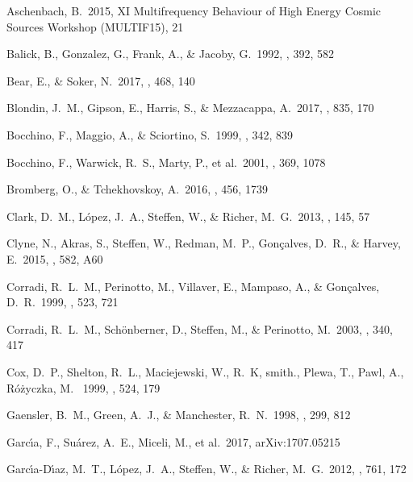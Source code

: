 \documentclass[12pt,preprint,a4paper]{aastex}
\begin{document}
 
\begin{thebibliography}

  Aschenbach, B.\ 2015, XI Multifrequency Behaviour of High Energy Cosmic Sources Workshop (MULTIF15), 21 

 Balick, B., Gonzalez, G., Frank, A., \& Jacoby, G.\ 1992, \apj, 392, 582 

 Bear, E., \& Soker, N.\ 2017, \mnras, 468, 140

 Blondin, J.~M., Gipson, E., Harris, S., \& Mezzacappa, A.\ 2017, \apj, 835, 170

 Bocchino, F., Maggio, A., \& Sciortino, S.\ 1999, \aap, 342, 839

 Bocchino, F., Warwick, R.~S., Marty, P., et al.\ 2001, \aap, 369, 1078

 Bromberg, O., \& Tchekhovskoy, A.\ 2016, \mnras, 456, 1739

 Clark, D.~M., L{\'o}pez, J.~A., Steffen, W., \& Richer, M.~G.\ 2013, \aj, 145, 57

 Clyne, N., Akras, S., Steffen, W., Redman, M.~P., Gonçalves, D.~R., \& Harvey, E.\ 2015, \aap, 582, A60

 Corradi, R.~L.~M., Perinotto, M., Villaver, E., Mampaso, A., \& Gon{\c c}alves, D.~R.\ 1999, \apj, 523, 721 

 Corradi, R.~L.~M., Sch{\"o}nberner, D., Steffen, M., \& Perinotto, M.\ 2003, \mnras, 340, 417 

 Cox, D.~P., Shelton, R.~L., Maciejewski, W., R.~K, smith., Plewa, T., Pawl, A., R\'{o}\.{z}yczka, M. \ 1999, \apj, 524, 179


 Gaensler, B.~M., Green, A.~J., \& Manchester, R.~N.\ 1998, \mnras, 299, 812


 Garc{\'{\i}}a, F., Su{\'a}rez, A.~E., Miceli, M., et al.\ 2017, arXiv:1707.05215 

 Garc{\'{\i}}a-D{\'{\i}}az, M.~T., L{\'o}pez, J.~A., Steffen, W., \& Richer, M.~G.\ 2012, \apj, 761, 172


\end{thebibliography}
\end{document}
